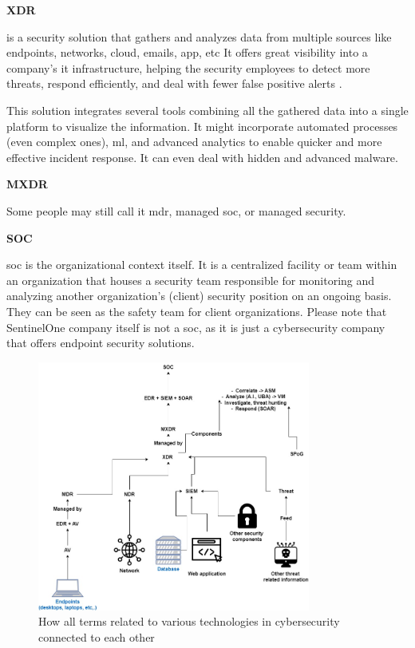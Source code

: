 \begin{multicols}{2}
      \textbf{XDR}

      is a security solution that gathers and analyzes data from multiple sources like endpoints, networks, cloud, emails, app,
      \acrshort{etc} It offers great visibility into a company's \acrshort{it} infrastructure, helping the security employees to detect
      more threats, respond efficiently, and deal with fewer false positive alerts \cite{xdrIDC}.

      This solution integrates several tools combining all the gathered data into a single platform to visualize the information. It might
      incorporate automated processes (even complex ones), \acrshort{ml}, and advanced analytics to enable quicker and more effective
      incident response. It can even deal with hidden and advanced malware.

      \textbf{MXDR}

      Some people may still call it \acrshort{mdr}, managed \acrshort{soc}, or managed security.

      \textbf{SOC}

      \acrshort{soc} is the organizational context itself. It is a centralized facility or team within an organization that houses a
      security team responsible for monitoring and analyzing another organization's (client) security position on an ongoing basis. They
      can be seen as the safety team for client organizations. Please note that SentinelOne company itself is not a \acrshort{soc}, as it
      is just a cybersecurity company that offers endpoint security solutions.

\end{multicols}

\begin{figure}[htbp]
      \centering
      \includegraphics[width=0.8\textwidth]{Figures/XDR.jpg}
      \caption{How all terms related to various technologies in cybersecurity connected to each other}
      \label{fig:xdr}
\end{figure}

